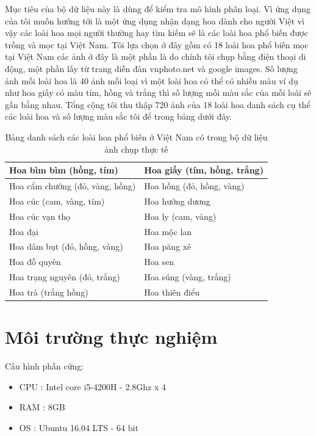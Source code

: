 \documentclass[12pt]{report}
\begin{document}
		Mục tiêu của bộ dữ liệu này là dùng để kiểm tra mô hình phân loại. Vì ứng dụng của tôi muốn hướng tới là một ứng dụng nhận dạng hoa dành cho người Việt vì vậy các loài hoa mọi người thường hay tìm kiếm sẽ là các loài hoa phổ biến được trồng và mọc tại Việt Nam. Tôi lựa chọn ở đây gồm có 18 loài hoa phổ biến mọc tại Việt Nam các ảnh ở đây là một phần là do chính tôi chụp bằng điện thoại di động, một phần lấy từ trang diễn đàn vnphoto.net và google images. Số lượng ảnh mỗi loài hoa là 40 ảnh mỗi loại vì một loài hoa có thể có nhiều màu ví dụ như hoa giấy có màu tím, hồng và trắng thì số lượng mỗi màu sắc của mỗi loài sẽ gần bằng nhau. Tổng cộng tôi thu thập 720 ảnh của 18 loài hoa danh sách cụ thể các loài hoa và số lượng màu sắc tôi để trong bảng dưới đây.
								
								
		\begin{table}[h]
			\centering
			\caption{Bảng danh sách các loài hoa phổ biến ở Việt Nam có trong bộ dữ liệu ảnh chụp thực tế}
			\label{tbl:table danh sach hoa vn}
			\begin{tabular}{|l|l|}
				\hline
				Hoa bìm bìm (hồng, tím)               & Hoa giấy (tím, hồng, trắng) \\ \hline
				Hoa cẩm chướng (đỏ, vàng, hồng) & Hoa hồng (đỏ, hồng, vàng)  \\ \hline
				Hoa cúc (cam, vàng, tím)                & Hoa hướng dương               \\ \hline       
				Hoa cúc vạn thọ                       & Hoa ly (cam, vàng)                \\ \hline     
				Hoa đại                                 & Hoa mộc lan                      \\ \hline       
				Hoa dâm bụt (đỏ, hồng, vàng)      & Hoa păng xê                      \\ \hline 
				Hoa đỗ quyên                           & Hoa sen                            \\ \hline      
				Hoa trạng nguyên (đỏ, trắng)       & Hoa súng (vàng, trắng)         \\ \hline
				Hoa trà (trắng hồng)                  & Hoa thiên điểu                 \\ \hline   			
			\end{tabular}
		\end{table}
				
		\section{Môi trường thực nghiệm}
		Cấu hình phần cứng:
		\begin{itemize}
			\item CPU	: Intel core i5-4200H - 2.8Ghz x 4
			\item RAM	: 8GB
			\item OS	: Ubuntu 16.04 LTS - 64 bit
		\end{itemize}
				
\end{document}

